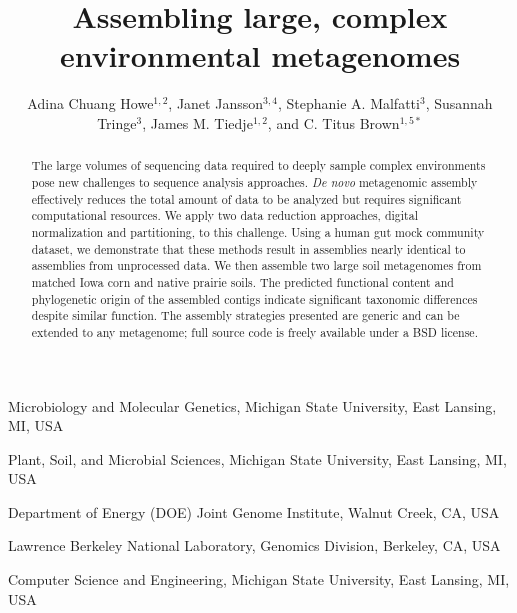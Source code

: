 \documentclass{nature}%
\title{Assembling large, complex environmental metagenomes}
\author{Adina Chuang Howe$^{1,2}$, 
Janet Jansson$^{3,4}$,
Stephanie A. Malfatti$^{3}$,
Susannah Tringe$^{3}$,
James M. Tiedje$^{1,2}$, and 
C. Titus Brown$^{1,5\ast}$}
\begin{document}
\maketitle

\begin{affiliations}
\item Microbiology and Molecular Genetics, Michigan State University, East Lansing, MI, USA\\
\item Plant, Soil, and Microbial Sciences, Michigan State University, East Lansing, MI, USA\\
\item Department of Energy (DOE) Joint Genome Institute, Walnut Creek, CA, USA\\
\item Lawrence Berkeley National Laboratory, Genomics Division, Berkeley, CA, USA\\
\item Computer Science and Engineering, Michigan State University, East Lansing, MI, USA\\
\end{affiliations}

\begin{abstract}
The large volumes of sequencing data required to deeply sample complex
environments pose new challenges to sequence analysis approaches.
\emph{De novo} metagenomic assembly effectively reduces the total
amount of data to be analyzed but requires significant computational
resources.  We apply two data reduction approaches, digital
normalization and partitioning, to this challenge.  Using a human gut
mock community dataset, we demonstrate that these methods result in
assemblies nearly identical to assemblies from unprocessed data.  We
then assemble two large soil metagenomes from matched Iowa corn and
native prairie soils.  The predicted functional content and phylogenetic
origin of the assembled contigs indicate significant taxonomic
differences despite similar function.  The assembly strategies
presented are generic and can be extended to any metagenome; full
source code is freely available under a BSD
license.
\end{abstract}
\end{document}
